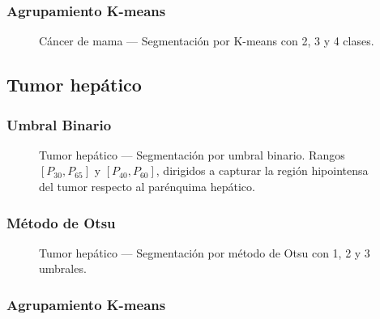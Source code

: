 \documentclass[12pt, a4paper]{article}
\begin{document}
\subsubsection{Agrupamiento K-means}

\begin{figure}[H]
  \centering
  \caption{Cáncer de mama — Segmentación por K-means con 2, 3 y 4 clases.}
  \label{fig:breast_kmeans}
\end{figure}

\subsection{Tumor hepático}

\subsubsection{Umbral Binario}

\begin{figure}[H]
  \centering
  \caption{Tumor hepático — Segmentación por umbral binario. Rangos $[P_{30}, P_{65}]$
    y $[P_{40}, P_{60}]$, dirigidos a capturar la región hipointensa del tumor
    respecto al parénquima hepático.}
  \label{fig:liver_binary}
\end{figure}

\subsubsection{Método de Otsu}

\begin{figure}[H]
  \centering
  \caption{Tumor hepático — Segmentación por método de Otsu con 1, 2 y 3 umbrales.}
  \label{fig:liver_otsu}
\end{figure}

\subsubsection{Agrupamiento K-means}
\end{document}
